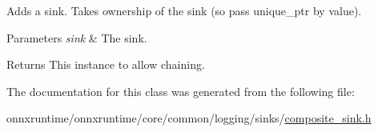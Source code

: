 Adds a sink. Takes ownership of the sink (so pass unique\+\_\+ptr by value). 


\begin{DoxyParams}{Parameters}
{\em sink} & The sink.\\
\hline
\end{DoxyParams}
\begin{DoxyReturn}{Returns}
This instance to allow chaining.
\end{DoxyReturn}


The documentation for this class was generated from the following file\+:\begin{DoxyCompactItemize}
\item 
onnxruntime/onnxruntime/core/common/logging/sinks/\mbox{\hyperlink{composite__sink_8h}{composite\+\_\+sink.\+h}}\end{DoxyCompactItemize}
